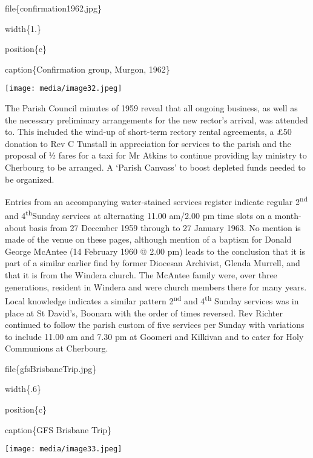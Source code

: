 file\{confirmation1962.jpg\}

width\{1.\}

position\{c\}

caption\{Confirmation group, Murgon, 1962\}

\texttt{[image: media/image32.jpeg]}

The Parish Council minutes of 1959 reveal that all ongoing business, as well as the necessary preliminary arrangements for the new rector's arrival, was attended to. This included the wind-up of short-term rectory rental agreements, a £50 donation to Rev C Tunstall in appreciation for services to the parish and the proposal of ½ fares for a taxi for Mr Atkins to continue providing lay ministry to Cherbourg to be arranged. A `Parish Canvass' to boost depleted funds needed to be organized.

Entries from an accompanying water-stained services register indicate regular 2\textsuperscript{nd} and 4\textsuperscript{th}Sunday services at alternating 11.00 am/2.00 pm time slots on a month-about basis from 27 December 1959 through to 27 January 1963. No mention is made of the venue on these pages, although mention of a baptism for Donald George McAntee (14 February 1960 @ 2.00 pm) leads to the conclusion that it is part of a similar earlier find by former Diocesan Archivist, Glenda Murrell, and that it is from the Windera church. The McAntee family were, over three generations, resident in Windera and were church members there for many years. Local knowledge indicates a similar pattern 2\textsuperscript{nd} and 4\textsuperscript{th} Sunday services was in place at St David's, Boonara with the order of times reversed. Rev Richter continued to follow the parish custom of five services per Sunday with variations to include 11.00 am and 7.30 pm at Goomeri and Kilkivan and to cater for Holy Communions at Cherbourg.

file\{gfsBrisbaneTrip.jpg\}

width\{.6\}

position\{c\}

caption\{GFS Brisbane Trip\}

\texttt{[image: media/image33.jpeg]}


